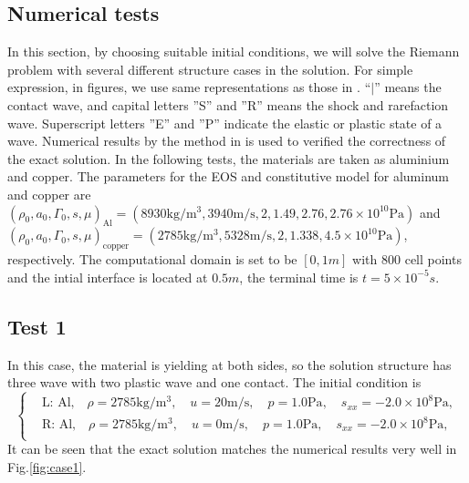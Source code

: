 \documentclass[review]{elsarticle}
\begin{document}
\begin{enumerate}[Step 1]
\section{Numerical  tests }
In this section, by choosing suitable initial conditions, we will solve the Riemann problem with several different structure cases in the solution. For simple  expression, in figures, we use same representations as those in \cite{gao2018complete}. ``$|$'' means the contact wave, and capital letters ''S'' and ''R'' means the shock and rarefaction wave. Superscript letters ''E'' and  ''P'' indicate the elastic or plastic state of a wave.  Numerical results by the method  in \cite{liumulti} is used to verified the correctness of the exact solution. In the following tests, the materials are taken as  aluminium and copper. The parameters for the EOS and constitutive model for aluminum and copper  are
$ (\rho_0, a_0, \Gamma_0, s, \mu)_{\text{Al}} =(8930 \text{kg}/\text{m}^3, 3940 \text{m}/\text{s},2, 1.49, 2.76 ,2.76\times 10^{10} \text{Pa} )$ and   $(\rho_0, a_0, \Gamma_0, s, \mu)_{\text{copper}} =(2785 \text{kg}/\text{m}^3, 5328 \text{m}/\text{s},2, 1.338,4.5\times 10^{10}\text{Pa})$, respectively. The computational domain is set to be $[0,1m]$ with 800 cell points and the intial interface is located at $0.5m$, the terminal time is $t=5\times 10^{-5}s$.

\subsection{Test 1}
In this case, the material is yielding at both sides, so the solution structure has three wave with two plastic wave and one contact.  
The initial condition is
\begin{equation}
 \left\{ \begin{aligned}
&	 \text{L: Al,}\quad  \rho = 2785 \text{kg}/\text{m}^3, \quad  u = 20\text{m}/\text{s}, \quad  p = 1.0\text{Pa}, \quad  s_{xx}=-2.0\times 10^8 \text{Pa},\\
&	 \text{R: Al,}\quad  \rho = 2785 \text{kg}/\text{m}^3, \quad  u = 0\text{m}/\text{s}, \quad  p = 1.0\text{Pa}, \quad  s_{xx}=-2.0\times 10^8 \text{Pa},\\
   \end{aligned}
 \right.
\end{equation}
It can be seen that the exact solution matches the numerical results very well in Fig.\ref{fig:case1}.
\begin{figure}
  \centering


\end{figure}
\end{enumerate}
\end{document}
